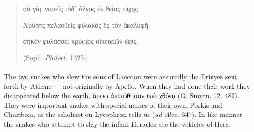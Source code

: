 \documentclass[a4paper, 11pt, oneside, polutonikogreek, english]{article}
\begin{document}
\begin{quotation}
σὺ γὰρ νοσεῖς τόδ᾽ ἄλγος ἐκ θείας τύχης

Χρύσης πελασθεὶς φύλακος ὃς τὸν ἀκαλυφῆ

σηκὸν φυλάσσει κρύφιος οἰκουρῶν ὄφις.

(Soph. \emph{Philoct.} 1325).
\end{quotation}
\paragraph{}
The two snakes who slew the sons of Laocoon were assuredly the Erinyes sent forth by Athene --- not originally by Apollo. When they had done their work they disappeared below the earth, ἄμφω ἀιστώθησαν ὑπὸ χθόνα (Q. Smyrn. 12, 480). They were important snakes with special names of their own, Porkis and Chariboia, as the scholiast on Lycophron tells us (\emph{ad Alex.} 347). In like manner the snakes who attempt to slay the infant Heracles are the vehicles of Hera.
\end{document}
